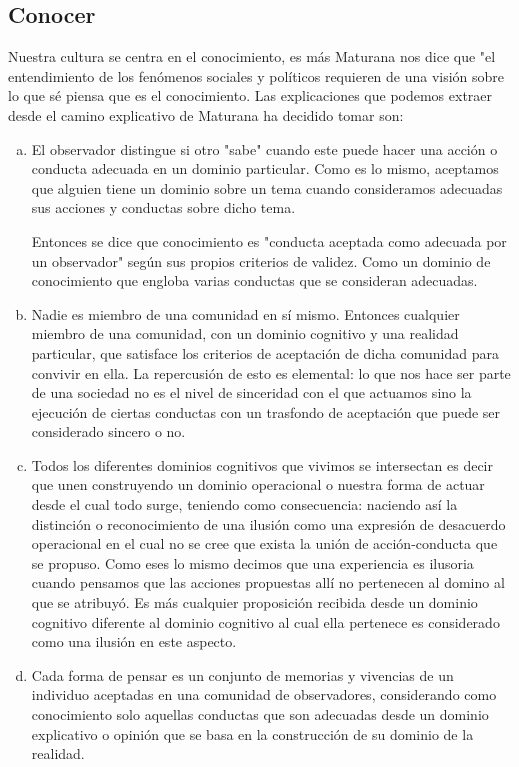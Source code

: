 \documentclass[10pt]{article}
\begin{document}
        \subsection{Conocer}

        Nuestra cultura se centra en el conocimiento, es más Maturana nos dice que "el entendimiento de los fenómenos sociales y políticos requieren de una visión sobre lo que sé piensa que es el conocimiento. Las explicaciones que podemos extraer desde el camino explicativo de Maturana ha decidido tomar son:
        
        \begin{enumerate}[a)]
            \item El observador distingue si otro "sabe" cuando este puede hacer una acción o conducta adecuada en un dominio particular. Como es lo mismo, aceptamos que alguien tiene un dominio sobre un tema cuando consideramos adecuadas sus acciones y conductas sobre dicho tema.
            
            Entonces se dice que conocimiento es "conducta aceptada como adecuada por un observador" según sus propios criterios de validez. Como un dominio de conocimiento que engloba varias conductas que se consideran adecuadas.

            \item  Nadie es miembro de una comunidad en sí mismo. Entonces cualquier miembro de una comunidad, con un dominio cognitivo y una realidad particular, que satisface los criterios de aceptación de dicha comunidad para convivir en ella. La repercusión de esto es elemental: lo que nos hace ser parte de una sociedad no es el nivel de sinceridad con el que actuamos sino la ejecución de ciertas conductas con un trasfondo de aceptación que puede ser considerado sincero o no.
            \item Todos los diferentes dominios cognitivos que vivimos se intersectan es decir que unen construyendo un dominio operacional o nuestra forma de actuar desde el cual todo surge, teniendo como consecuencia: naciendo así la distinción o reconocimiento de una ilusión como una expresión de desacuerdo operacional en el cual no se cree que exista la unión de acción-conducta que se propuso. Como eses lo mismo decimos que una experiencia es ilusoria cuando pensamos que las acciones  propuestas allí no pertenecen al domino al que se atribuyó. Es más cualquier proposición recibida desde un dominio cognitivo diferente  al dominio cognitivo al cual ella pertenece es considerado como una ilusión en este aspecto.
            \item Cada forma de pensar es un conjunto de memorias y vivencias de un individuo aceptadas en una comunidad de observadores, considerando como conocimiento solo aquellas conductas que son adecuadas desde un dominio explicativo o opinión que se basa en la construcción de su dominio de la realidad. 


\end{enumerate}
\end{document}
